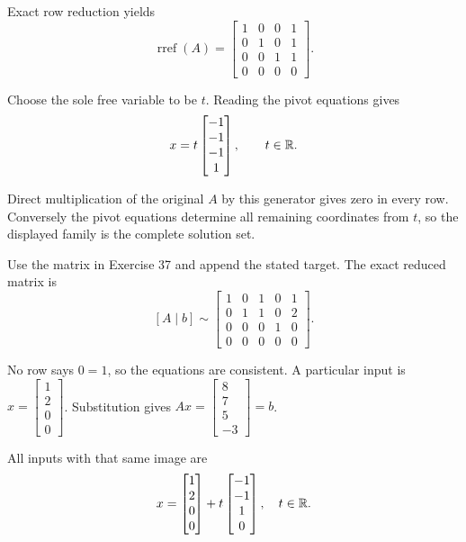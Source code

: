 Exact row reduction yields
\[ \operatorname{rref}(A)=\begin{bmatrix}1 & 0 & 0 & 1\\0 & 1 & 0 & 1\\0 & 0 & 1 & 1\\0 & 0 & 0 & 0\end{bmatrix}.\]

Choose the sole free variable to be $t$. Reading the pivot equations gives
\[ x=t\begin{bmatrix}-1\\-1\\-1\\1\end{bmatrix},\qquad t\in\mathbb{R}.\]

Direct multiplication of the original $A$ by this generator gives zero in every row. Conversely the pivot equations determine all remaining coordinates from $t$, so the displayed family is the complete solution set.



Use the matrix in Exercise 37 and append the stated target. The exact reduced matrix is
\[ [A\mid b]\sim \begin{bmatrix}1 & 0 & 1 & 0 & 1\\0 & 1 & 1 & 0 & 2\\0 & 0 & 0 & 1 & 0\\0 & 0 & 0 & 0 & 0\end{bmatrix}.\]

No row says $0=1$, so the equations are consistent. A particular input is $x=\begin{bmatrix}1\\2\\0\\0\end{bmatrix}$. Substitution gives $Ax=\begin{bmatrix}8\\7\\5\\-3\end{bmatrix}=b$.

All inputs with that same image are
\[ x=\begin{bmatrix}1\\2\\0\\0\end{bmatrix}+t\begin{bmatrix}-1\\-1\\1\\0\end{bmatrix},\quad t\in\mathbb{R}.\]

